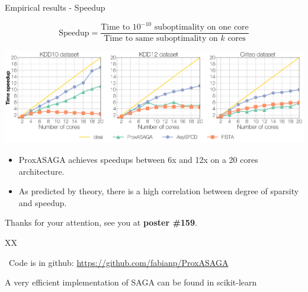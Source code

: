 \documentclass[10pt]{beamer}
\begin{document}
\begin{frame}{Empirical results - Speedup}

$$
\text{Speedup} = \frac{\text{Time to $10^{-10}$ suboptimality 
on one core}}{\text{Time to same suboptimality on $k$ cores}}
$$

\includegraphics[width=\linewidth]{img/prox_asaga_2}

\begin{itemize}
\pause \item ProxASAGA achieves speedups between 6x and 12x on a 20 cores architecture.

\pause \vspace{0.5em}\item As predicted by theory, there is a high correlation between degree of sparsity and speedup.
\end{itemize}

\pause Thanks for your attention, see you at {\bfseries poster \#159}.
\end{frame}

\begin{frame}{XX}

\faGithub~Code is in github: \url{https://github.com/fabianp/ProxASAGA}

A very efficient implementation of SAGA can be found in scikit-learn
\end{frame}
\end{document}
